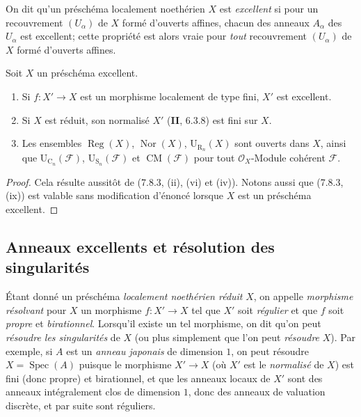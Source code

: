 \begin{env}[7.8.5]
\label{IV.2.s7.8.5-fr}
On dit qu'un préschéma localement noethérien $X$ est \emph{excellent} si pour
un recouvrement $(U_\alpha)$ de $X$ formé d'ouverts affines, chacun des anneaux
$A_\alpha$ des $U_\alpha$ est excellent; cette propriété est alors vraie pour
\emph{tout} recouvrement $(U_\alpha)$ de $X$ formé d'ouverts affines.
\end{env}

\begin{proposition}[7.8.6]
\label{IV.2.s7.8.6-fr}
Soit $X$ un préschéma excellent.
\begin{enumerate}
\item[\emph{(i)}] Si $f:X'\to X$ est un morphisme localement de type fini, $X'$ est
excellent.


\item[\emph{(ii)}] Si $X$ est réduit, son normalisé $X'$ (\textbf{II}, 6.3.8) est fini
sur $X$.
\item[\emph{(iii)}] Les ensembles $\operatorname{Reg}(X)$, $\operatorname{Nor}(X)$,
$\mathrm U_{\mathrm R_n}(X)$ sont ouverts dans $X$, ainsi que
$\mathrm U_{\mathrm C_n}(\mathcal F)$, $\mathrm U_{\mathrm S_n}(\mathcal F)$
et $\operatorname{CM}(\mathcal F)$ pour tout $\mathcal O_X$-Module cohérent
$\mathcal F$.
\end{enumerate}
\end{proposition}

\begin{proof}
Cela résulte aussitôt de (7.8.3, (ii), (vi) et (iv)). Notons aussi que (7.8.3,
(ix)) est valable sans modification d'énoncé lorsque $X$ est un préschéma
excellent.
\end{proof}

\subsection{Anneaux excellents et résolution des singularités}
\label{subsection:IV.2.7.9-fr}

\begin{env}[7.9.1]
\label{IV.2.s7.9.1-fr}
Étant donné un préschéma \emph{localement noethérien réduit} $X$, on appelle
\emph{morphisme résolvant} pour $X$ un morphisme $f:X'\to X$ tel que $X'$ soit
\emph{régulier} et que $f$ soit \emph{propre} et \emph{birationnel}. Lorsqu'il
existe un tel morphisme, on dit qu'on peut \emph{résoudre les singularités} de
$X$ (ou plus simplement que l'on peut \emph{résoudre} $X$). Par exemple, si
$A$ est un \emph{anneau japonais} de dimension $1$, on peut résoudre
$X=\operatorname{Spec}(A)$ puisque le morphisme $X'\to X$ (où $X'$ est le
\emph{normalisé} de $X$) est fini (donc propre) et birationnel, et que les
anneaux locaux de $X'$ sont des anneaux intégralement clos de dimension $1$,
donc des anneaux de valuation discrète, et par suite sont réguliers.
\end{env}

